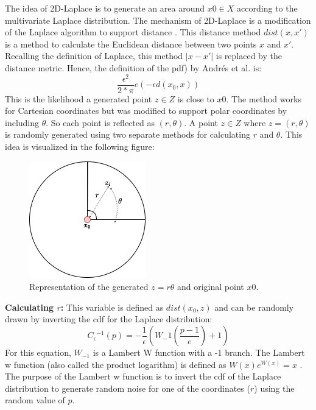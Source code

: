 The idea of 2D-Laplace is to generate an area around $x0 \in X$ according to the multivariate Laplace distribution.
The mechanism of 2D-Laplace is a modification of the Laplace algorithm to support distance \citep{DBLP:journals/corr/abs-1212-1984}.
This distance method $dist(x, x')$ is a method to calculate the Euclidean distance between two points $x$ and $x'$.
Recalling the definition of Laplace, this method $|x-x'|$ is replaced by the distance metric.
Hence, the definition of the \gls{pdf}) by Andrés et al. is:
\begin{equation}
  \frac{\epsilon^2}{2*\pi}e(-\epsilon d(x_0, x))
  \label{eq:polar-laplace-pdf}
\end{equation}
This is the likelihood a generated point $z \in Z$ is close to $x0$.
The method works for Cartesian coordinates but was modified to support polar coordinates by including $\theta$.
So each point is reflected as $(r, \theta)$.
A point $z \in Z$ where $z = (r, \theta)$ is randomly generated using two separate methods for calculating $r$ and $\theta$.
This idea is visualized in the following figure:
\begin{figure}[H]
  \includegraphics[scale=0.6]{TheorethicalFramework/ND-Laplace/Images/polar-laplace.png}
  \centering
  \caption{Representation of the generated $z = {r \theta}$ and original point $x0$.}
  \label{figure:parea}
\end{figure}

\textbf{Calculating $r$:}
This variable is defined as $dist(x_0, z)$ and can be randomly drawn by inverting the \gls{cdf} for the Laplace distribution:
\begin{equation}
  C{_\epsilon}{^{-1}}(p) = - \frac{1}{\epsilon}(W_-1 (\frac{p - 1}{e}) + 1)
\end{equation}
For this equation, $W_{-1}$ is a Lambert W function with a -1 branch.
The Lambert w function (also called the product logarithm) is defined as $W(x)e^{W(x)} = x$ \citep{lehtonen_lambert_2016}.
The purpose of the Lambert w function is to invert the \gls{cdf} of the Laplace distribution to generate random noise for one of the coordinates ($r$) using the random value of $p$.


